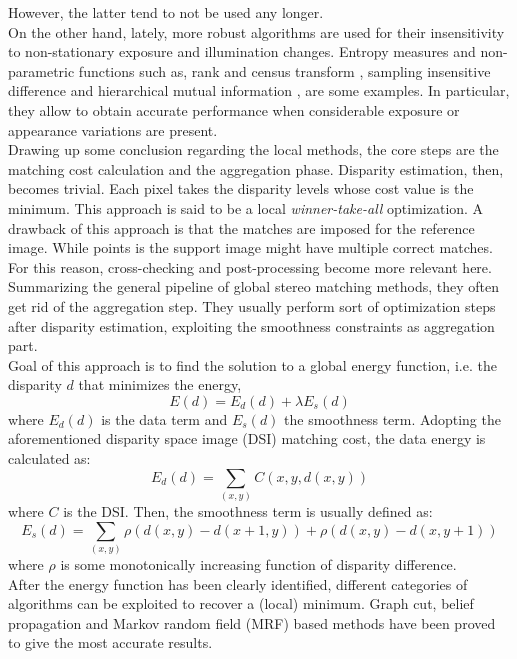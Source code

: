 However, the latter tend to not be used any longer. \\
On the other hand, lately, more robust algorithms are used for their insensitivity to non-stationary exposure and illumination changes. 
Entropy measures and non-parametric functions such as, rank and census transform \citep{Zabih1994}, sampling insensitive difference\citep{Birchfield1999} and hierarchical mutual information \citep{Hirschmuller2008}, are some examples.
In particular, they allow to obtain accurate performance when considerable exposure or appearance variations are present. \\
Drawing up some conclusion regarding the local methods, the core steps are the matching cost calculation and the aggregation phase. 
Disparity estimation, then, becomes trivial. Each pixel takes the disparity levels whose cost value is the minimum. 
This approach is said to be a local \textit{winner-take-all} optimization. 
A drawback of this approach is that the matches are imposed for the reference image. 
While points is the support image might have multiple correct matches. 
For this reason, cross-checking and post-processing become more relevant here.\\
Summarizing the general pipeline of global stereo matching methods, they often get rid of the aggregation step. 
They usually perform sort of optimization steps after disparity estimation, exploiting the smoothness constraints as aggregation part. \\
Goal of this approach is to find the solution to a global energy function, i.e. the disparity $d$ that minimizes the energy,
\begin{equation}\label{eqn:energyfct}
	E(d) = E_d(d) + \lambda E_s(d)
\end{equation}
where $E_d(d)$ is the data term and $E_s(d)$ the smoothness term.
Adopting the aforementioned disparity space image (DSI) matching cost, the data energy is calculated as:
\begin{equation}\label{dataterm}
	E_d(d) = \sum_{(x,y)} C(x, y, d(x, y))
\end{equation}
where $C$ is the DSI.
Then, the smoothness term is usually defined as:
\begin{equation}\label{smoothterm}
	E_s(d) = \sum_{(x,y)} \rho (d(x,y) - d(x + 1, y)) + \rho (d(x,y) - d(x, y + 1))
\end{equation}
where $\rho$ is some monotonically increasing function of disparity difference. \\
After the energy function has been clearly identified, different categories of algorithms can be exploited to recover a (local) minimum.
Graph cut, belief propagation and Markov random field (MRF) based methods have been proved to give the most accurate results. 


